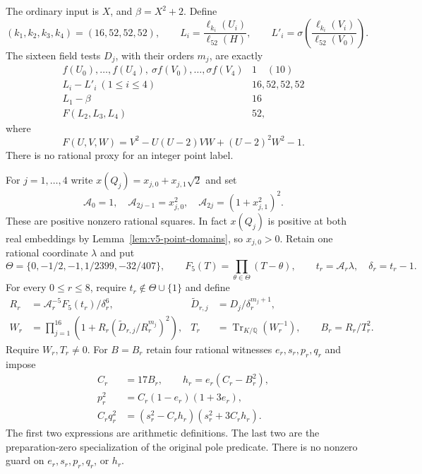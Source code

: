 \documentclass[11pt]{article}
\theoremstyle{definition}
\theoremstyle{remark}
\newcommand{\Q}{\mathbb Q}
\newcommand{\Tr}{\operatorname{Tr}}
\begin{document}
The ordinary input is $X$, and $\beta=X^2+2$. Define
\[
 (k_1,k_2,k_3,k_4)=(16,52,52,52),\qquad
 L_i=\frac{\ell_{k_i}(U_i)}{\ell_{52}(H)},\qquad
 L'_i=\sigma\!\left(\frac{\ell_{k_i}(V_i)}{\ell_{52}(V_0)}\right).
\]
The sixteen field tests $D_j$, with their orders $m_j$, are exactly
\begin{equation}\label{eq:v5-test-list}
\begin{array}{c|c}
 f(U_0),\ldots,f(U_4),\ \sigma f(V_0),\ldots,\sigma f(V_4)&1\quad(10)\\
 L_i-L'_i\ (1\le i\le4)&16,52,52,52\\
 L_1-\beta&16\\
 F(L_2,L_3,L_4)&52,
\end{array}
\end{equation}
where
\begin{equation}\label{eq:v5-lucas-polynomial}
 F(U,V,W)=V^2-U(U-2)VW+(U-2)^2W^2-1.
\end{equation}
There is no rational proxy for an integer point label.

For $j=1,\ldots,4$ write $x(Q_j)=x_{j,0}+x_{j,1}\sqrt2$ and set
\[
 \mathcal A_0=1,\quad
 \mathcal A_{2j-1}=x_{j,0}^2,\quad
 \mathcal A_{2j}=(1+x_{j,1}^2)^2.
\]
These are positive nonzero rational squares. In fact $x(Q_j)$ is
positive at both real embeddings by Lemma~\ref{lem:v5-point-domains},
so $x_{j,0}>0$. Retain one rational coordinate $\lambda$ and put
\[
 \Theta=\{0,-1/2,-1,1/2399,-32/407\},\qquad
 F_5(T)=\prod_{\theta\in\Theta}(T-\theta),\qquad
 t_r=\mathcal A_r\lambda,\quad\delta_r=t_r-1.
\]
For every $0\le r\le8$, require $t_r\notin\Theta\cup\{1\}$ and define
\begin{align}
 R_r&=\mathcal A_r^{-5}F_5(t_r)/\delta_r^6,
 &\widetilde D_{r,j}&=D_j/\delta_r^{m_j+1},\label{eq:v5-detector-data}\\
 W_r&=\prod_{j=1}^{16}
 \left(1+R_r(\widetilde D_{r,j}/R_r^{m_j})^2\right),
 &T_r&=\Tr_{K/\Q}(W_r^{-1}),\qquad B_r=R_r/T_r^2.
 \label{eq:v5-detector-product}
\end{align}
Require $W_r,T_r\ne0$. For $B=B_r$ retain four rational witnesses
$e_r,s_r,p_r,q_r$ and impose
\begin{equation}\label{eq:v5-zero-pole}
 \begin{aligned}
 C_r&=17B_r,\qquad h_r=e_r(C_r-B_r^2),\\
 p_r^2&=C_r(1-e_r)(1+3e_r),\\
 C_rq_r^2&=(s_r^2-C_rh_r)(s_r^2+3C_rh_r).
 \end{aligned}
\end{equation}
The first two expressions are arithmetic definitions. The last two
are the preparation-zero specialization of the original pole predicate.
There is no nonzero guard on $e_r,s_r,p_r,q_r$, or $h_r$.
\end{document}
